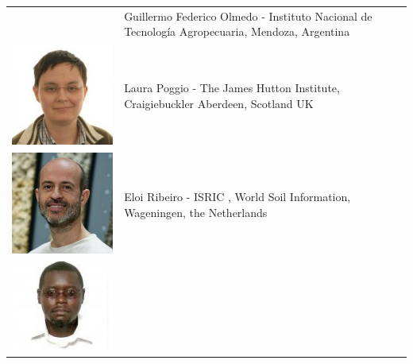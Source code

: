 \documentclass[10pt,b5paper,]{book}
\theoremstyle{definition}
\theoremstyle{definition}
\theoremstyle{definition}
\theoremstyle{remark}
\begin{document}
\begin{longtable}[]{@{}ll@{}}
\begin{minipage}[t]{0.13\columnwidth}
\end{minipage} & \begin{minipage}[t]{0.81\columnwidth}\raggedright
Guillermo Federico Olmedo - Instituto Nacional de Tecnología
Agropecuaria, Mendoza, Argentina\strut
\end{minipage}\tabularnewline
\begin{minipage}[t]{0.13\columnwidth}\raggedright
\includegraphics{contrAuthors/Poggio.jpg}\strut
\end{minipage} & \begin{minipage}[t]{0.81\columnwidth}\raggedright
Laura Poggio - The James Hutton Institute, Craigiebuckler Aberdeen,
Scotland UK\strut
\end{minipage}\tabularnewline
\begin{minipage}[t]{0.13\columnwidth}\raggedright
\includegraphics{contrAuthors/Ribeiro.jpg}\strut
\end{minipage} & \begin{minipage}[t]{0.81\columnwidth}\raggedright
Eloi Ribeiro - ISRIC , World Soil Information, Wageningen, the
Netherlands\strut
\end{minipage}\tabularnewline
\begin{minipage}[t]{0.13\columnwidth}\raggedright
\includegraphics{contrAuthors/Omuto.jpg}\strut

\end{minipage}
\end{longtable}
\end{document}
